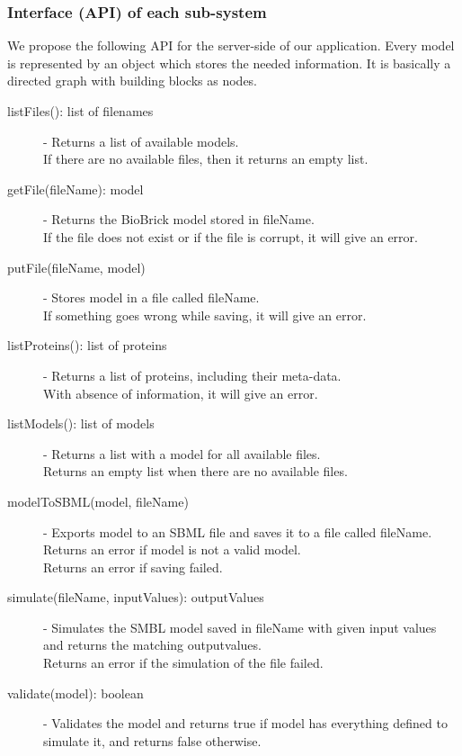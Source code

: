 \documentclass[a4paper]{article}
\begin{document}
\subsubsection{Interface (API) of each sub-system}

We propose the following API for the server-side of our application. Every model is represented by an object which stores the needed information. It is basically a directed graph with building blocks as nodes. \\
\begin{description}
	\item[listFiles(): list of filenames] -
		Returns a list of available models.\\
		If there are no available files, then it returns an empty list.
	\item[getFile(fileName): model] -
		Returns the BioBrick model stored in fileName.\\
		If the file does not exist or if the file is corrupt, it will give an error.
	\item[putFile(fileName, model)] -
		Stores model in a file called fileName.\\
		If something goes wrong while saving, it will give an error.
	\item[listProteins(): list of proteins] -
		Returns a list of proteins, including their meta-data.\\
		With absence of information, it will give an error.
	\item[listModels(): list of models] -
		Returns a list with a model for all available files.\\
		Returns an empty list when there are no available files.
	\item[modelToSBML(model, fileName)] -
		Exports model to an SBML file and saves it to a file called fileName.\\
		Returns an error if model is not a valid model.\\
		Returns an error if saving failed.
	\item[simulate(fileName, inputValues): outputValues] -
		Simulates the SMBL model saved in fileName with given input values and returns the matching outputvalues.\\
		Returns an error if the simulation of the file failed.
	\item[validate(model): boolean] -
		Validates the model and returns true if model has everything defined to simulate it, and returns false otherwise.\\
\end{description}
\end{document}

